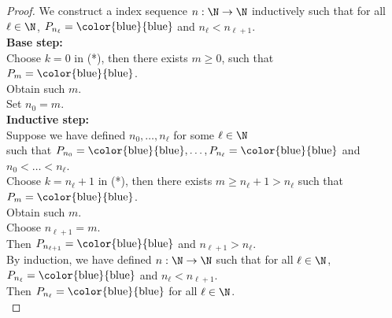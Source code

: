 \documentclass[problem]{classnotes}
\newcommand{\blue}{\text{\color{blue}{blue}}}
\begin{document}
    \begin{proof}
        We construct a index sequence $n: \N \to \N$ inductively such that for all $\ell \in \N$, $P_{n_\ell} = \blue$ and $n_\ell < n_{\ell+1}$.\\

        \noindent\textbf{Base step:} \\
        Choose $k = 0$ in (*), then there exists $m \ge 0$, such that $P_m = \blue$. \\
        Obtain such $m$. \\
        Set $n_0 = m$. \\

        \noindent\textbf{Inductive step:} \\
        Suppose we have defined $n_0,\dots,n_\ell$ for some $\ell \in \N$ \\
        such that $P_{n_0} = \blue,\dots,P_{n_\ell} = \blue$ and $n_0 < \dots < n_\ell$. \\
        Choose $k = n_\ell + 1$ in (*), then there exists $m \ge n_\ell + 1 > n_\ell$ such that $P_m = \blue$. \\
        Obtain such $m$. \\
        Choose $n_{\ell+1} = m$. \\
        Then $P_{n_{\ell+1}} = \blue$ and $n_{\ell+1} > n_\ell$. \\

        By induction, we have defined $n: \N \to \N$ such that for all $\ell \in \N$, $P_{n_\ell} = \blue$ and $n_\ell < n_{\ell+1}$. \\
        Then $P_{n_\ell} = \blue$ for all $\ell \in \N$. \\
    \end{proof}

    \newpage
\end{document}
